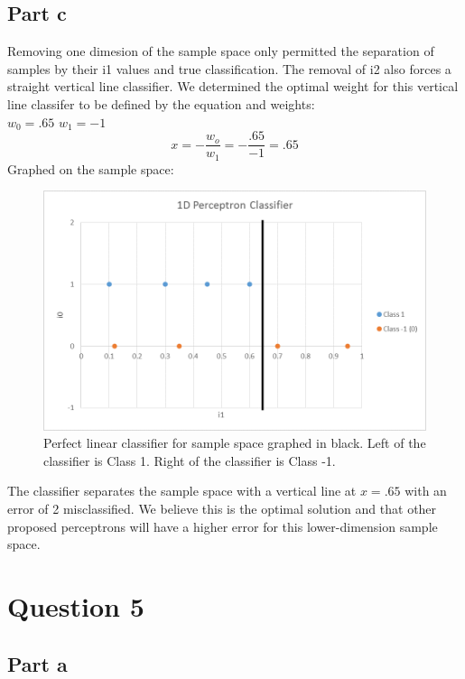 \documentclass[12pt]{article}
\begin{document}
\subsection*{Part c}
Removing one dimesion of the sample space only permitted the separation of samples by their i1 values and true classification. The removal of i2 also forces a straight vertical line classifier. We determined the optimal weight for this vertical line classifer to be defined by the equation and weights:\\
$w_0 = .65$
$w_1 = -1$
\begin{equation}
x = -\frac{w_o}{w_1} = -\frac{.65}{-1} = .65
\end{equation}
Graphed on the sample space:
\begin{figure}[H]
    \centering
    \includegraphics[width=1\textwidth]{question_4_plot_c}
    \caption{Perfect linear classifier for sample space graphed in black. Left of the classifier is Class 1. Right of the classifier is Class -1.}
    \label{fig:question_4_plot_b}
\end{figure}
The classifier separates the sample space with a vertical line at $x=.65$ with an error of 2 misclassified. We believe this is the optimal solution and that other proposed perceptrons will have a higher error for this lower-dimension sample space. 

\section*{Question 5}

\subsection*{Part a}
\end{document}
